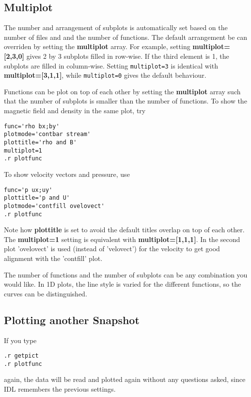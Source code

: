 \subsection{Multiplot \label{s-multiplot}}

   The number and arrangement of subplots is automatically set based 
   on the number of files and and the number of functions. 
   The default arrangement be can overriden by setting the
   {\bf multiplot} array. For example, setting 
   {\bf multiplot=[2,3,0]} gives 2 by 3 subplots filled in row-wise.
   If the third element is 1, the subplots are filled in column-wise.
   Setting {\tt multiplot=3} is identical with {\bf multiplot=[3,1,1]},
   while {\tt multiplot=0} gives the default behaviour.

   Functions can be plot on top of each other by setting the {\bf multiplot}
   array such that the number of subplots is smaller than the number of
   functions. To show the magnetic field and density in the same plot, try
\begin{verbatim}
func='rho bx;by'
plotmode='contbar stream'
plottitle='rho and B'
multiplot=1
.r plotfunc
\end{verbatim}
   To show velocity vectors and pressure, use
\begin{verbatim}
func='p ux;uy'
plottitle='p and U'
plotmode='contfill ovelovect'
.r plotfunc
\end{verbatim}
   Note how {\bf plottitle} is set to avoid the default titles
   overlap on top of each other. The {\bf multiplot=1} setting
   is equivalent with {\bf multiplot=[1,1,1]}. In the second plot
   'ovelovect' is used (instead of 'velovect') for the velocity to get 
   good alignment with the 'contfill' plot.

   The number of functions and the number of subplots can be any combination
   you would like. In 1D plots, the line style is varied for the different 
   functions, so the curves can be distinguished.

\subsection{Plotting another Snapshot \label{s-plot-another}}

   If you type
\begin{verbatim}
.r getpict
.r plotfunc
\end{verbatim}
   again, the data will be read and plotted again without any questions asked,
   since IDL remembers the previous settings. 

